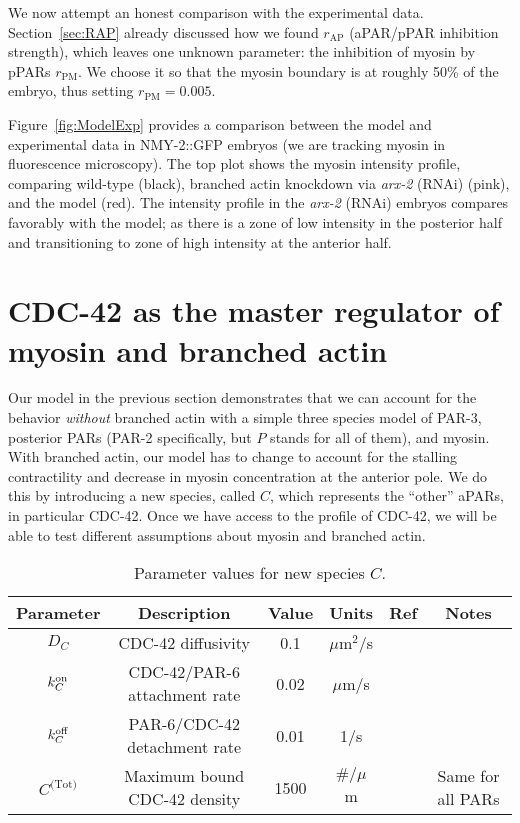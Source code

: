\documentclass[11pt]{article}
\newcommand{\6}[1]{#1_{\text{6}}}
\newcommand{\3}[1]{#1_{\text{3}}}
\newcommand{\Tot}[1]{#1^\text{(Tot)}}
\newcommand{\C}[1]{#1_C}
\begin{document}
We now attempt an honest comparison with the experimental data. Section\ \ref{sec:RAP} already discussed how we found $r_\text{AP}$ (aPAR/pPAR inhibition strength), which leaves one unknown parameter: the inhibition of myosin by pPARs $r_\text{PM}$. We choose it so that the myosin boundary is at roughly 50\% of the embryo, thus setting $r_\text{PM}=0.005$. 

Figure\ \ref{fig:ModelExp} provides a comparison between the model and experimental data in NMY-2::GFP embryos (we are tracking myosin in fluorescence microscopy). The top plot shows the myosin intensity profile, comparing wild-type (black), branched actin knockdown via \emph{arx-2} (RNAi) (pink), and the model (red). The intensity profile in the \emph{arx-2} (RNAi) embryos compares favorably with the model; as there is a zone of low intensity in the posterior half and transitioning to zone of high intensity at the anterior half.


\section{CDC-42 as the master regulator of myosin and branched actin}
Our model in the previous section demonstrates that we can account for the behavior \emph{without} branched actin with a simple three species model of PAR-3, posterior PARs (PAR-2 specifically, but $P$ stands for all of them), and myosin. With branched actin, our model has to change to account for the stalling contractility and decrease in myosin concentration at the anterior pole. We do this by introducing a new species, called $C$, which represents the ``other'' aPARs, in particular CDC-42. Once we have access to the profile of CDC-42, we will be able to test different assumptions about myosin and branched actin. 

\begin{table}
\begin{small}
\centering
\begin{tabular}{|c|c|c|c|c|c|}\hline
Parameter & Description & Value & Units & Ref & Notes \\ \hline
$\C{D}$ & CDC-42 diffusivity & 0.1 & $\mu$m$^2$/s & \cite{robin2014single} &\\
$\C{\kon}$ & CDC-42/PAR-6 attachment rate & 0.02 & $\mu$m/s & \cite{gross2019guiding} & \\
$\C{\koff} $ & PAR-6/CDC-42 detachment rate & 0.01 & 1/s & \cite{robin2014single}& \\
$\Tot{C}$ & Maximum bound CDC-42 density & 1500 & $\#/\mu$m &\cite{gross2019guiding} & Same for all PARs \\ \hline
\end{tabular}
\caption{\label{tab:paramsC} Parameter values for new species $C$.}
\end{small}
\end{table}
\end{document}
